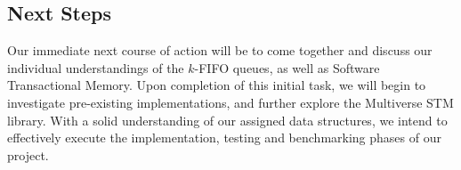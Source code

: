 \documentclass[a4paper, 10pt, conference]{ieeeconf}  %
\begin{document}
\subsection{Next Steps}
Our immediate next course of action will be to come together and discuss our individual understandings of the $k$-FIFO queues, as well as Software Transactional Memory. Upon completion of this initial task, we will begin to investigate pre-existing implementations, and further explore the Multiverse STM library. With a solid understanding of our assigned data structures, we intend to effectively execute the implementation, testing and benchmarking phases of our project.

\printbibliography
\end{document}
